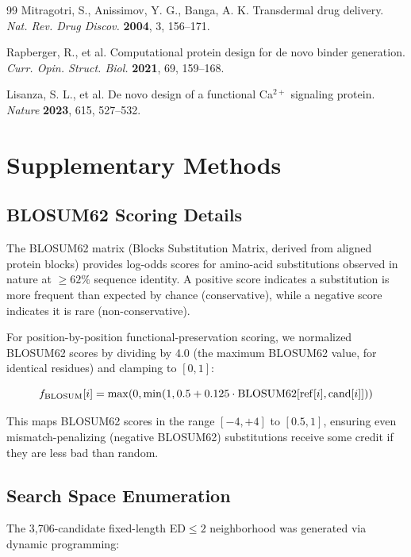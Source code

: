 \documentclass[11pt,a4paper]{article}
\begin{document}
\begin{thebibliography}{99}
 Mitragotri, S., Anissimov, Y. G., Banga, A. K. Transdermal drug delivery. \textit{Nat. Rev. Drug Discov.} \textbf{2004}, 3, 156--171.

 Rapberger, R., et al. Computational protein design for de novo binder generation. \textit{Curr. Opin. Struct. Biol.} \textbf{2021}, 69, 159--168.

 Lisanza, S. L., et al. De novo design of a functional Ca$^{2+}$ signaling protein. \textit{Nature} \textbf{2023}, 615, 527--532.

\end{thebibliography}

\appendix

\section{Supplementary Methods}

\subsection{BLOSUM62 Scoring Details}

The BLOSUM62 matrix (Blocks Substitution Matrix, derived from aligned protein blocks) provides log-odds scores for amino-acid substitutions observed in nature at $\geq 62\%$ sequence identity. A positive score indicates a substitution is more frequent than expected by chance (conservative), while a negative score indicates it is rare (non-conservative).

For position-by-position functional-preservation scoring, we normalized BLOSUM62 scores by dividing by 4.0 (the maximum BLOSUM62 value, for identical residues) and clamping to $[0, 1]$:

\begin{equation}
f_{\text{BLOSUM}}[i] = \max(0, \min(1, 0.5 + 0.125 \cdot \text{BLOSUM62}[{\rm ref}[i], {\rm cand}[i]]))
\end{equation}

This maps BLOSUM62 scores in the range $[-4, +4]$ to $[0.5, 1]$, ensuring even mismatch-penalizing (negative BLOSUM62) substitutions receive some credit if they are less bad than random.

\subsection{Search Space Enumeration}

The 3,706-candidate fixed-length ED$\leq 2$ neighborhood was generated via dynamic programming:
\end{document}
